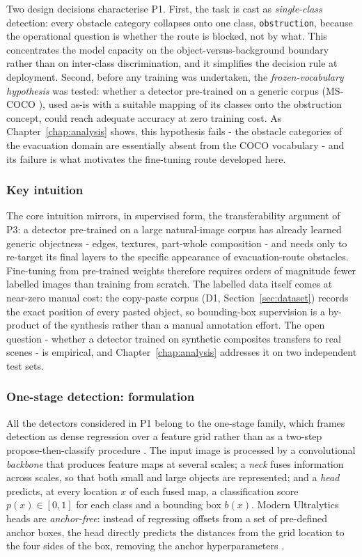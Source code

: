 Two design decisions characterise P1. First, the task is cast as
\emph{single-class} detection: every obstacle category collapses onto one
class, \texttt{obstruction}, because the operational question is whether the
route is blocked, not by what. This concentrates the model capacity on the
object-versus-background boundary rather than on inter-class discrimination,
and it simplifies the decision rule at deployment. Second, before any training
was undertaken, the \emph{frozen-vocabulary hypothesis} was tested: whether a
detector pre-trained on a generic corpus (MS-COCO \cite{Lin2014coco}), used
as-is with a suitable mapping of its classes onto the obstruction concept,
could reach adequate accuracy at zero training cost. As
Chapter~\ref{chap:analysis} shows, this hypothesis fails - the obstacle
categories of the evacuation domain are essentially absent from the COCO
vocabulary - and its failure is what motivates the fine-tuning route developed
here.

\subsubsection{Key intuition}

The core intuition mirrors, in supervised form, the transferability argument of
P3: a detector pre-trained on a large natural-image corpus has already learned
generic objectness - edges, textures, part-whole composition - and needs only
to re-target its final layers to the specific appearance of evacuation-route
obstacles. Fine-tuning from pre-trained weights therefore requires orders of
magnitude fewer labelled images than training from scratch. The labelled data
itself comes at near-zero manual cost: the copy-paste corpus (D1,
Section~\ref{sec:dataset}) records the exact position of every pasted object,
so bounding-box supervision is a by-product of the synthesis rather than a
manual annotation effort. The open question - whether a detector trained on
synthetic composites transfers to real scenes - is empirical, and
Chapter~\ref{chap:analysis} addresses it on two independent test sets.

\subsubsection{One-stage detection: formulation}

All the detectors considered in P1 belong to the one-stage family, which frames
detection as dense regression over a feature grid rather than as a two-step
propose-then-classify procedure \cite{Ren2015fasterrcnn}. The input image is
processed by a convolutional \emph{backbone} that produces feature maps at
several scales; a \emph{neck} fuses information across scales, so that both
small and large objects are represented; and a \emph{head} predicts, at every
location $x$ of each fused map, a classification score $p(x) \in [0,1]$ for
each class and a bounding box $b(x)$. Modern Ultralytics heads are
\emph{anchor-free}: instead of regressing offsets from a set of pre-defined
anchor boxes, the head directly predicts the distances from the grid location
to the four sides of the box, removing the anchor hyperparameters
\cite{Jocher2024yolo11}.

